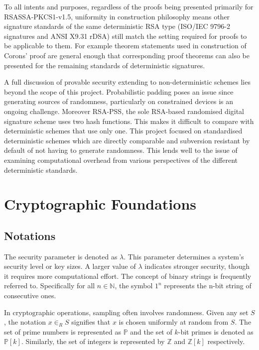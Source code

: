 \documentclass[]{final_report}
\theoremstyle{definition}
\begin{document}
To all intents and purposes, regardless of the proofs being presented primarily for RSASSA-PKCS1-v1.5, uniformity in construction philosophy means other signature standards of the same deterministic RSA type (ISO/IEC 9796-2 signatures and ANSI X9.31 rDSA) still match the setting required for proofs to be applicable to them. For example theorem statements used in construction of Corons' proof \cite{coron2002security} are general enough that corresponding proof theorems can also be presented for the remaining standards of deterministic signatures. 

A full discussion of provable security extending to non-deterministic schemes lies beyond the scope of this project. Probabilistic padding poses an issue since generating sources of randomness, particularly on constrained devices is an ongoing challenge. Moreover RSA-PSS, the sole RSA-based randomised digital signature scheme uses two hash functions. This makes it difficult to compare with deterministic schemes that use only one. This project focused on standardised deterministic schemes which are directly comparable and subversion resistant \cite{ateniese2015subversion} by default of not having to generate randomness. This lends well to the issue of examining computational overhead from various perspectives of the different deterministic standards.



\chapter{Cryptographic Foundations}
\section{Notations}
The security parameter is denoted as \( \lambda \). 
This parameter determines a system's security level or key sizes. A larger value of $\lambda$ indicates stronger security, though it requires more computational effort. The concept of binary strings is frequently referred to. Specifically for all \( n \in \mathbb{N} \), the symbol \( 1^n \) represents the n-bit string of consecutive ones. 

In cryptographic operations, sampling often involves randomness. Given any set \( S \), the notation \( x \in_{R} S \) signifies that \( x \) is chosen uniformly at random from \( S \).  
The set of prime numbers is represented as \( \mathbb{P} \) and the set of \( k \)-bit primes is denoted as \( \mathbb{P}[k] \). Similarly, the set of integers is represented by \( \mathbb{Z} \) and \( \mathbb{Z}[k] \) respectively. 
\end{document}
